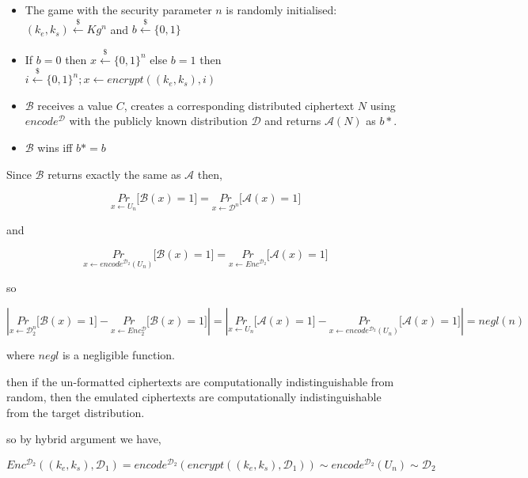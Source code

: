 \documentclass[ %
                    author={Samuel Russell},
                supervisor={Prof. Bogdan Warinschi},
                    degree={MEng},
                     title={Innocuous Ciphertexts},
                  subtitle={The DE-CENSOR Scheme},
                      type={research},
                      year={2018} ]{dissertation}
\begin{document}
\begin{itemize}

\item The game with the security parameter $n$ is randomly initialised: $(k_e, k_s) \xleftarrow{\$} Kg^{n}$ and $b \xleftarrow{\$} \{0,1\}$

\item If $b=0$ then $x \xleftarrow{\$} \{0,1\}^n$ else $b=1$ then $i \xleftarrow{\$} \{0,1\}^n; x \leftarrow encrypt((k_e, k_s), i)$

\item $\mathcal{B}$ receives a value $C$, creates a corresponding distributed ciphertext $N$ using $encode^\mathcal{D}$ with the publicly known distribution $\mathcal{D}$ and returns $\mathcal{A}(N)$ as $b*$.

\item $\mathcal{B}$ wins iff $b* = b$

\end{itemize}

Since $\mathcal{B}$ returns exactly the same as $\mathcal{A}$ then,

$$\underset{x \leftarrow U_n}{Pr} \big[ \mathcal{B}(x) = 1 \big] = \underset{x \leftarrow\mathcal{D}^n}{Pr} \big[ \mathcal{A}(x) = 1 \big] $$

and

$$\underset{x \leftarrow encode^{\mathcal{D}_2}(U_n)}{Pr} \big[ \mathcal{B}(x) = 1 \big] = \underset{x \leftarrow Enc^{\mathcal{D}_2}}{Pr} \big[ \mathcal{A}(x) = 1 \big] $$

so

$$ \left|  \underset{x \leftarrow \mathcal{D}^n_2}{Pr} \big[ \mathcal{B}(x) = 1 \big] - \underset{x \leftarrow Enc_2^{\mathcal{D}}}{Pr} \big[ \mathcal{B}(x) = 1 \big]\right| = \left|  \underset{x \leftarrow U_n}{Pr} \big[ \mathcal{A}(x) = 1 \big] - \underset{x \leftarrow encode^{\mathcal{D}_2}(U_n)}{Pr} \big[ \mathcal{A}(x) = 1 \big]\right| = negl(n)$$


where $negl$ is a negligible function.

then if the un-formatted ciphertexts are computationally indistinguishable from random, then the emulated ciphertexts are computationally indistinguishable from the target distribution.

so by hybrid argument we have,

$$ Enc^{\mathcal{D}_2}((k_e,k_s), \mathcal{D}_1) = encode^{\mathcal{D}_2} \left( encrypt \left( (k_e, k_s), \mathcal{D}_1 \right) \right) \sim  encode^{\mathcal{D}_2} \left( U_n \right) \sim \mathcal{D}_2$$
\end{document}
